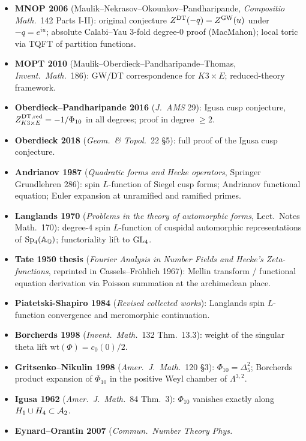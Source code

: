 \begin{itemize}[leftmargin=1.5em]
\item \textbf{MNOP 2006} (Maulik--Nekrasov--Okounkov--Pandharipande,
  \emph{Compositio Math.}\ 142 Parts I-II): original conjecture
  $Z^{\mathrm{DT}}(-q)=Z^{\mathrm{GW}}(u)$ under $-q=e^{iu}$; absolute
  Calabi--Yau 3-fold degree-$0$ proof (MacMahon); local toric
  via TQFT of partition functions.
\item \textbf{MOPT 2010} (Maulik--Oberdieck--Pandharipande--Thomas,
  \emph{Invent.\ Math.}\ 186): GW/DT correspondence for $K3\times E$;
  reduced-theory framework.
\item \textbf{Oberdieck--Pandharipande 2016} (\emph{J.\ AMS} 29):
  Igusa cusp conjecture, $Z^{\mathrm{DT},\mathrm{red}}_{K3\times E}=-1/\Phi_{10}$
  in all degrees; proof in degree $\ge 2$.
\item \textbf{Oberdieck 2018} (\emph{Geom.\ \& Topol.}\ 22 \S5):
  full proof of the Igusa cusp conjecture.
\item \textbf{Andrianov 1987} (\emph{Quadratic forms and Hecke
  operators}, Springer Grundlehren 286): spin $L$-function of
  Siegel cusp forms; Andrianov functional equation; Euler
  expansion at unramified and ramified primes.
\item \textbf{Langlands 1970} (\emph{Problems in the theory of
  automorphic forms}, Lect.\ Notes Math.\ 170): degree-$4$ spin
  $L$-function of cuspidal automorphic representations of
  $\mathrm{Sp}_4(\mathbb A_{\mathbb{Q}})$; functoriality lift to $\mathrm{GL}_4$.
\item \textbf{Tate 1950 thesis} (\emph{Fourier Analysis in Number
  Fields and Hecke's Zeta-functions}, reprinted in Cassels--Fröhlich
  1967): Mellin transform / functional equation derivation via
  Poisson summation at the archimedean place.
\item \textbf{Piatetski-Shapiro 1984} (\emph{Revised collected
  works}): Langlands spin $L$-function convergence and
  meromorphic continuation.
\item \textbf{Borcherds 1998} (\emph{Invent.\ Math.}\ 132 Thm.\
  13.3): weight of the singular theta lift
  $\mathrm{wt}(\Phi)=c_0(0)/2$.
\item \textbf{Gritsenko--Nikulin 1998} (\emph{Amer.\ J.\ Math.}\
  120 \S3): $\Phi_{10}=\Delta_5^2$; Borcherds product expansion
  of $\Phi_{10}$ in the positive Weyl chamber of $\Lambda^{3,2}$.
\item \textbf{Igusa 1962} (\emph{Amer.\ J.\ Math.}\ 84 Thm.\ 3):
  $\Phi_{10}$ vanishes exactly along $H_1\cup H_4\subset\mathcal{A}_2$.
\item \textbf{Eynard--Orantin 2007} (\emph{Commun.\ Number Theory Phys.}

\end{itemize}

